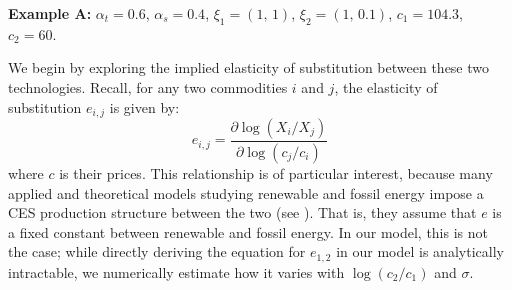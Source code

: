 \documentclass[11pt,a4paper]{extarticle}
\begin{document}
\begin{center}
	\noindent \textbf{Example  A:} $\alpha_t = 0.6$, $\alpha_s = 0.4$, $\xi_1 = (1, \, 1)$, $\xi_2 = (1, \, 0.1)$, $c_1 = 104.3$, $c_2 = 60$. 
	\label{Params: Example A}
\end{center}



We begin by exploring the implied elasticity of substitution between these two technologies. Recall, for any two commodities $i$ and $j$,  the elasticity of substitution $e_{i,j}$ is given by:
$$e_{i,j} = \frac{\partial \log (X_i/ X_j)}{\partial \log (c_j/c_i)}$$
where $c$ is their prices. This relationship is of particular interest, because many applied and theoretical models studying renewable and fossil energy impose a CES production structure between the two (see \citet{Pap}). That is, they assume that $e$ is a fixed constant between renewable and fossil energy. In our model, this is not the case; while directly deriving the equation for $e_{1,2}$ in our model is analytically intractable, we numerically estimate how it varies with $\log (c_2/c_1)$ and $\sigma$.
\end{document}
